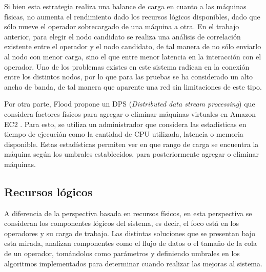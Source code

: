 Si bien esta estrategia realiza una balance de carga en cuanto a las m\'aquinas f\'isicas, no aumenta el rendimiento dado los recursos l\'ogicos disponibles, dado que s\'olo mueve el operador sobrecargado de una m\'aquina a otra. En el trabajo anterior, para elegir el nodo candidato se realiza una an\'alisis de correlaci\'on existente entre el operador y el nodo candidato, de tal manera de no s\'olo enviarlo al nodo con menor carga, sino el que entre menor latencia en la interacci\'on con el operador. Uno de los problemas existes en este sistema radican en la conexi\'on entre los distintos nodos, por lo que para las pruebas se ha considerado un alto ancho de banda, de tal manera que aparente una red sin limitaciones de este tipo.

Por otra parte, Flood \citep{Alves2010flood} propone un DPS (\textit{Distributed data stream processing}) que considera factores f\'isicos para agregar o eliminar m\'aquinas virtuales en Amazon EC2 \citep{amazonec2}. Para esto, se utiliza un administrador que considera las estad\'isticas en tiempo de ejecuci\'on como la cantidad de CPU utilizada, latencia o memoria disponible. Estas estad\'isticas permiten ver en que rango de carga se encuentra la m\'aquina seg\'un los umbrales establecidos, para posteriormente agregar o eliminar m\'aquinas.

\subsection{Recursos l\'ogicos}
\label{subsec:recLogicosBC}

A diferencia de la perspectiva basada en recursos f\'isicos, en esta perspectiva se consideran los componentes l\'ogicos del sistema, es decir, el foco est\'a en los operadores y su carga de trabajo. Las distintas soluciones que se presentan bajo esta mirada, analizan componentes como el flujo de datos o el tama\~no de la cola de un operador, tom\'andolos como par\'ametros y definiendo umbrales en los algoritmos implementados para determinar cuando realizar las mejoras al sistema.


